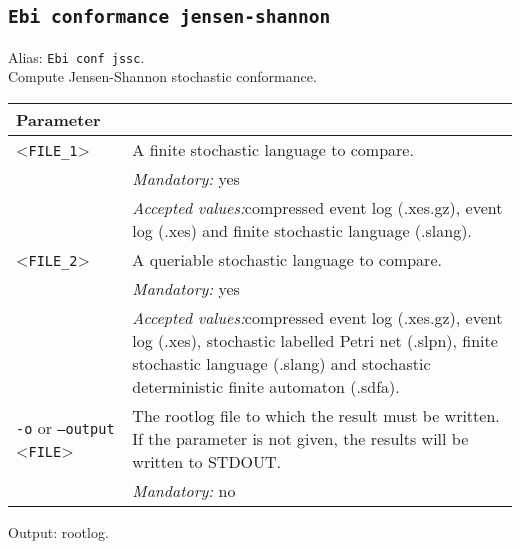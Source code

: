 {\subsection{\texttt{Ebi conformance jensen-shannon}}
Alias: \texttt{Ebi conf jssc}.\\
Compute Jensen-Shannon stochastic conformance.\\
\begin{tabularx}{\linewidth}{lX}
\toprule
Parameter \\\midrule
<\texttt{FILE\_1}>&A finite stochastic language to compare.\\
&\textit{Mandatory:} \quad yes\\
&\textit{Accepted values:}\quad compressed event log (.xes.gz), event log (.xes) and finite stochastic language (.slang).\\
<\texttt{FILE\_2}>&A queriable stochastic language to compare.\\
&\textit{Mandatory:} \quad yes\\
&\textit{Accepted values:}\quad compressed event log (.xes.gz), event log (.xes), stochastic labelled Petri net (.slpn), finite stochastic language (.slang) and stochastic deterministic finite automaton (.sdfa).\\
\texttt{-o} or \texttt{--output} <\texttt{FILE}> &
The rootlog file to which the result must be written. If the parameter is not given, the results will be written to STDOUT.\\
&\textit{Mandatory:} \quad no\\
\bottomrule
\end{tabularx}
Output: rootlog.
}
